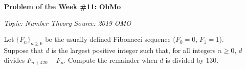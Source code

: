 \begin{potw}\vspace{5pt}
{\large\textbf{Problem of the Week \#11: OhMo}}\vspace{5pt}

\textit{Topic: Number Theory}\newline
\textit{Source: 2019 OMO}\V

Let $\{F_n\}_{n\geq 0}$ be the usually defined Fibonacci sequence ($F_0=0$, $F_1=1$). Suppose that $d$ is the largest positive integer such that, for all integers $n\geq 0$, $d$ divides $F_{n+420}-F_n$. Compute the remainder when $d$ is divided by $130$.
\end{potw}\V
